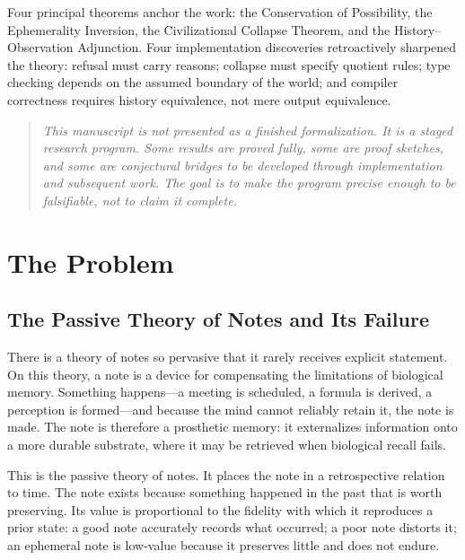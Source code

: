 \documentclass[12pt, a4paper, openany]{book}
\theoremstyle{plain}
\theoremstyle{definition}
\theoremstyle{remark}
\begin{document}
Four principal theorems anchor the work: the Conservation of Possibility, the
Ephemerality Inversion, the Civilizational Collapse Theorem, and the
History--Observation Adjunction. Four implementation discoveries retroactively
sharpened the theory: refusal must carry reasons; collapse must specify quotient
rules; type checking depends on the assumed boundary of the world; and compiler
correctness requires history equivalence, not mere output equivalence.


\begin{quote}\small\textit{This manuscript is not presented as a finished formalization. It is a staged research program. Some results are proved fully, some are proof sketches, and some are conjectural bridges to be developed through implementation and subsequent work. The goal is to make the program precise enough to be falsifiable, not to claim it complete.}\end{quote}

\newpage

\tableofcontents

\mainmatter

\part{The Problem}

\chapter{The Passive Theory of Notes and Its Failure}

There is a theory of notes so pervasive that it rarely receives explicit statement.
On this theory, a note is a device for compensating the limitations of biological
memory. Something happens---a meeting is scheduled, a formula is derived, a
perception is formed---and because the mind cannot reliably retain it, the note
is made. The note is therefore a prosthetic memory: it externalizes information
onto a more durable substrate, where it may be retrieved when biological recall
fails.

This is the passive theory of notes. It places the note in a retrospective
relation to time. The note exists because something happened in the past that is
worth preserving. Its value is proportional to the fidelity with which it
reproduces a prior state: a good note accurately records what occurred; a poor note
distorts it; an ephemeral note is low-value because it preserves little and does
not endure.
\end{document}
